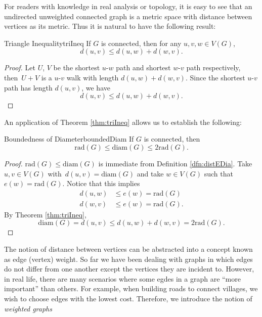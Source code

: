 \documentclass[math]{amznotes}
\theoremstyle{remark}
\begin{document}
For readers with knowledge in real analysis or topology, it is easy to see that an undirected unweighted connected graph is a metric space with distance between vertices as its metric. Thus it is natural to have the following result:
\begin{thmbox}{Triangle Inequality}{triIneq}
    If $G$ is connected, then for any $u, v, w \in V(G)$,
    \begin{equation*}
        d(u, v) \leq d(u, w) + d(w, v).
    \end{equation*}
    \tcblower   
    \begin{proof}
        Let $U$, $V$ be the shortest $u$-$w$ path and shortest $w$-$v$ path respectively, then~$U + V$ is a $u$-$v$ walk with length $d(u, w) + d(w, v)$. Since the shortest $u$-$v$ path has length $d(u, v)$, we have
        \begin{equation*}
            d(u, v) \leq d(u, w) + d(w, v).
        \end{equation*}
    \end{proof}
\end{thmbox}
An application of Theorem \ref{thm:triIneq} allows us to establish the following:
\begin{thmbox}{Boundedness of Diameter}{boundedDiam}
    If $G$ is connected, then
    \begin{equation*}
        \mathrm{rad}(G) \leq \mathrm{diam}(G) \leq 2\mathrm{rad}(G).
    \end{equation*}
    \tcblower
    \begin{proof}
        $\mathrm{rad}(G) \leq \mathrm{diam}(G)$ is immediate from Definition \ref{dfn:distEDia}. Take $u, v \in V(G)$ with~$d(u, v) = \mathrm{diam}(G)$ and take $w \in V(G)$ such that $e(w) = \mathrm{rad}(G)$. Notice that this implies
        \begin{align*}
            d(u, w) & \leq e(w) = \mathrm{rad}(G) \\
            d(w, v) & \leq e(w) = \mathrm{rad}(G).
        \end{align*}
        By Theorem \ref{thm:triIneq}, 
        \begin{equation*}
            \mathrm{diam}(G) = d(u, v) \leq d(u, w) + d(w, v) = 2\mathrm{rad}(G).
        \end{equation*}
    \end{proof}
\end{thmbox}
The notion of distance between vertices can be abstracted into a concept known as edge (vertex) weight. So far we have been dealing with graphs in which edges do not differ from one another except the vertices they are incident to. However, in real life, there are many scenarios where some egdes in a graph are ``more important'' than others. For example, when building roads to connect villages, we wish to choose edges with the lowest cost. Therefore, we introduce the notion of \textit{weighted graphs}
\end{document}
